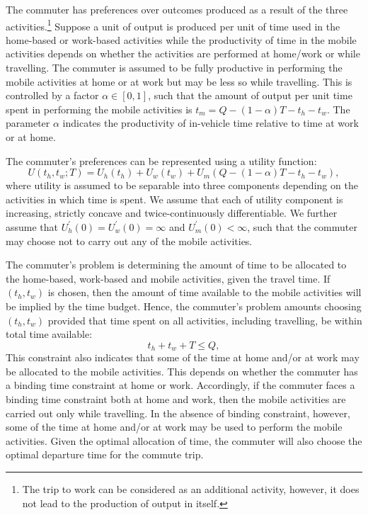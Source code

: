 \documentclass[12pt,a4paper,british]{article}
\theoremstyle{definition}
\theoremstyle{plain}
\theoremstyle{plain}
\theoremstyle{plain}
\begin{document}
The commuter has preferences over outcomes produced as a result of the three activities.\footnote{The trip to work can be considered as an additional activity, however, it does not lead to the production of output in itself.} Suppose a unit of output is produced per unit of time used in the home-based or work-based activities while the productivity of time in the mobile activities depends on whether the activities are performed at home/work or while travelling. The commuter is assumed to be fully productive in performing the mobile activities at home or at work but may be less so while travelling. This is controlled by a factor $\alpha \in \left[0, 1\right]$, such that the amount of output per unit time spent in performing the mobile activities is $t_{m} = Q - \left( 1 - \alpha \right) T - t_{h}-t_{w}$. The parameter $\alpha$ indicates the productivity of in-vehicle time relative to time at work or at home.

The commuter's preferences can be represented using a utility function:%
\begin{equation}
U\left(t_{h},t_{w};T\right)=U_{h}\left(t_{h}\right)+U_{w}\left(t_{w}\right)+U_{m}\left(Q-\left(1-\alpha\right)T-t_{h}-t_{w}\right),\label{utility}
\end{equation}
where utility is assumed to be separable into three components depending on the activities in which time is spent. We assume that each of utility component is increasing, strictly concave and twice-continuously differentiable. We further assume that $U_{h}^{\prime}\left(0\right) = U_{w}^{\prime}\left(0\right) = \infty$ and $U_{m}^{\prime}\left(0\right)<\infty$, such that the commuter may choose not to carry out any of the mobile activities.

The commuter's problem is determining the amount of time to be allocated to the home-based, work-based and mobile activities, given the travel time. If $\left(t_{h},t_{w}\right)$ is chosen, then the amount of time available to the mobile activities will be implied by the time budget. Hence, the commuter's problem amounts choosing $\left(t_{h},t_{w}\right)$ provided that time spent on all activities, including travelling, be within total time available:  
\begin{equation}
t_{h}+t_{w}+T\leq Q,\label{constraint}
\end{equation}
This constraint also indicates that some of the time at home and/or at work may be allocated to the mobile activities. This depends on whether the commuter has a binding time constraint at home or work. Accordingly, if the commuter faces a binding time constraint both at home and work, then the mobile activities are carried out only while travelling. In the absence of binding constraint, however, some of the time at home and/or at work may be used to perform the mobile activities. Given the optimal allocation of time, the commuter will also choose the optimal departure time for the commute trip.
\end{document}

